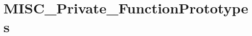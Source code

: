 \hypertarget{group___m_i_s_c___private___function_prototypes}{\section{M\-I\-S\-C\-\_\-\-Private\-\_\-\-Function\-Prototypes}
\label{group___m_i_s_c___private___function_prototypes}
}
